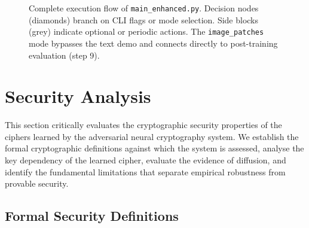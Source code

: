 \documentclass[12pt, a4paper]{article}
\newcommand{\code}[1]{\texttt{\color{CodeRed}#1}}
\begin{document}
\begin{figure}[H]
	\caption{Complete execution flow of \code{main\_enhanced.py}.
		Decision nodes (diamonds) branch on CLI flags or mode selection.
		Side blocks (grey) indicate optional or periodic actions.
		The \texttt{image\_patches} mode bypasses the text demo and connects
		directly to post-training evaluation (step 9).}
	\label{fig:exec_flow}
\end{figure}

\newpage
\section{Security Analysis}
\label{sec:security}

This section critically evaluates the cryptographic security properties
of the ciphers learned by the adversarial neural cryptography system.
We establish the formal cryptographic definitions against which the
system is assessed, analyse the key dependency of the learned cipher,
evaluate the evidence of diffusion, and identify the fundamental
limitations that separate empirical robustness from provable security.

\subsection{Formal Security Definitions}
\label{subsec:formal_security}
\end{document}
